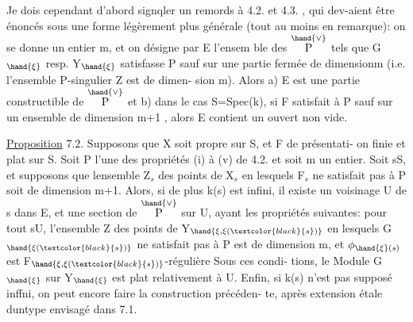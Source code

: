 
Je dois cependant d'abord signqler un remords à 4.2. et 4.3. , qui
dev-aient être énoncés sous une forme légèrement plus générale (tout au
moins en remarque): on se donne un entier m, et on désigne par E l'ensem
ble des \hand{$\xi\in$}$\overset{\hand{\vee}}{\text{P}}$ tels que G$_{\hand{\xi}}$ resp. Y$_{\hand{\xi}}$ satisfasse P sauf  sur une
partie fermée de dimension\hand{$\leq$}m (i.e. l'ensemble P-singulier Z est de dimen-%
sion\hand{$\leq$} m). Alors a) E est une partie constructible de $\overset{\hand{\vee}}{\text{P}}$ et b) dans le
cas S=Spec(k), si F  satisfait à P sauf  sur un ensemble de
dimension\hand{$\leq$} m+1 , alors E contient un ouvert non vide.

\uline{Proposition} 7.2. Supposons que X soit propre sur S, et F de présentati-%
on finie et plat sur S. Soit P l'une des propriétés (i) à (v) de 4.2.
et soit m un entier. Soit s\hand{$\in$}S, et supposons que 
 lensemble Z$_s$ des points de X$_s$ en lesquels F$_s$ ne satisfait
pas à P soit de dimension \hand{$\leq$} m+1. Alors, si de plus k(s) est infini, il
existe un voisinage U de s dans E, et une section \hand{$\xi$} de $\overset{\hand{\vee}}{\text{P}}$ sur U, ayant
les propriétés suivantes: pour tout s\hand{$\in$}U, l'ensemble Z des points
de  Y$_{\hand{\xi,\xi(\textcolor{black}{s})}}$ en lesquels G$_{\hand{\xi(\textcolor{black}{s})}}$ ne satisfait pas à P est de dimension
\hand{$\leq$}m, et $\phi_{\hand{\xi}(s)}$ est F$_{\hand{\xi,\xi(\textcolor{black}{s})}}$-régulière\hand{,}  Sous ces condi-%
tions, le Module G$_{\hand{\xi}}$ sur Y$_{\hand{\xi}}$ est plat relativement à U. Enfin, si k(s)
n'est pas supposé inffni, on peut encore faire la construction précéden-%
te, après extension étale duntype envisagé dans 7.1.

